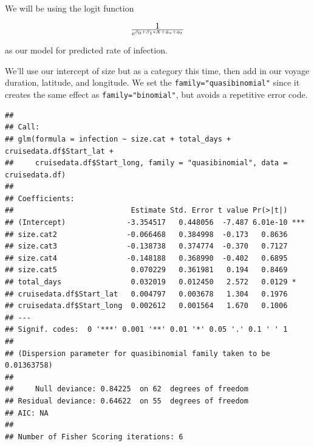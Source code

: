 \documentclass[
  11,
]{book}
\newenvironment{Shaded}{\begin{snugshade}}{\end{snugshade}}
\newcommand{\AttributeTok}[1]{\textcolor[rgb]{0.27,0.27,0.27}{#1}}
\newcommand{\FunctionTok}[1]{\textcolor[rgb]{0.27,0.27,0.27}{\textbf{#1}}}
\newcommand{\NormalTok}[1]{#1}
\newcommand{\OtherTok}[1]{\textcolor[rgb]{0.37,0.37,0.37}{#1}}
\newcommand{\SpecialCharTok}[1]{\textcolor[rgb]{0.43,0.43,0.43}{\textbf{#1}}}
\newcommand{\StringTok}[1]{\textcolor[rgb]{0.5,0.5,0.5}{#1}}
\begin{document}
We will be using the logit function

\begin{equation}
1 \over e^{\beta_0 + \beta_1*X + \phi_s + \phi_t}
\end{equation}

as our model for predicted rate of infection.

We'll use our intercept of size but as a category this time, then add in our voyage duration, latitude, and longitude. We set the \texttt{family="quasibinomial"} since it creates the same effect as \texttt{family="binomial"}, but avoids a repetitive error code.

\begin{Shaded}
\end{Shaded}

\begin{verbatim}
## 
## Call:
## glm(formula = infection ~ size.cat + total_days + cruisedata.df$Start_lat + 
##     cruisedata.df$Start_long, family = "quasibinomial", data = cruisedata.df)
## 
## Coefficients:
##                           Estimate Std. Error t value Pr(>|t|)    
## (Intercept)              -3.354517   0.448056  -7.487 6.01e-10 ***
## size.cat2                -0.066468   0.384998  -0.173   0.8636    
## size.cat3                -0.138738   0.374774  -0.370   0.7127    
## size.cat4                -0.148188   0.368990  -0.402   0.6895    
## size.cat5                 0.070229   0.361981   0.194   0.8469    
## total_days                0.032019   0.012450   2.572   0.0129 *  
## cruisedata.df$Start_lat   0.004797   0.003678   1.304   0.1976    
## cruisedata.df$Start_long  0.002612   0.001564   1.670   0.1006    
## ---
## Signif. codes:  0 '***' 0.001 '**' 0.01 '*' 0.05 '.' 0.1 ' ' 1
## 
## (Dispersion parameter for quasibinomial family taken to be 0.01363758)
## 
##     Null deviance: 0.84225  on 62  degrees of freedom
## Residual deviance: 0.64622  on 55  degrees of freedom
## AIC: NA
## 
## Number of Fisher Scoring iterations: 6
\end{verbatim}
\end{document}
